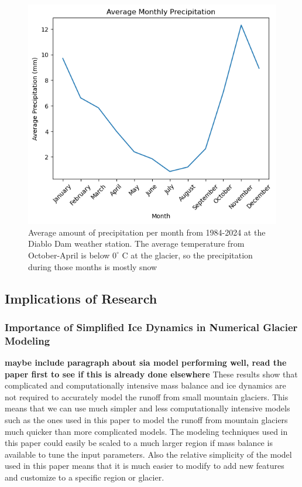 \documentclass{article}
\begin{document}
\begin{figure}[h]
    \centering
    \includegraphics[width=\textwidth]{Plots/monthly_precip.png}
    \caption{Average amount of precipitation per month from 1984-2024 at the Diablo Dam weather station. The average temperature from October-April is below $0^\circ$ C at the glacier, so the precipitation during those months is mostly snow}
    \label{fig:monthly_precip}
\end{figure}    
\FloatBarrier

\subsection{Implications of Research}
\subsubsection{Importance of Simplified Ice Dynamics in Numerical Glacier Modeling}
\textbf{maybe include paragraph about sia model performing well, read the paper first to see if this is already done elsewhere}
These results show that complicated and computationally intensive mass balance and ice dynamics are not required to accurately model the 
runoff from small mountain glaciers. This means that we can use much simpler and less computationally intensive models such as the ones used 
in this paper to model the runoff from mountain glaciers much quicker than more complicated models. The modeling techniques used in this paper could 
easily be scaled to a much larger region if mass balance is available to tune the input parameters. Also the relative simplicity of the model used in 
this paper means that it is much easier to modify to add new features and customize to a specific region or glacier.
\end{document}
